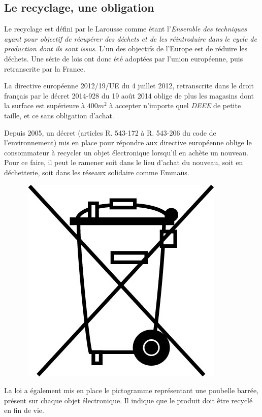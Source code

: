 \subsection{Le recyclage, une obligation}

Le recyclage est défini par le Larousse  comme étant l'\og{}\textit{Ensemble des techniques ayant pour objectif de récupérer des déchets et de les réintroduire dans le cycle de production dont ils sont issus}\fg{}. L'un des objectifs de l'Europe est de réduire les déchets. Une série de lois ont donc été adoptées par l'union européenne, puis retranscrite par la France. 

La directive européenne 2012/19/UE du 4 juillet 2012, retranscrite dans le droit français par le décret 2014-928 du 19 août 2014 oblige de plus les magasins dont la surface est supérieure à $400m^2$ à accepter n'importe quel \textit{DEEE} de petite taille, et ce sans obligation d'achat. 

Depuis 2005, un décret (articles R. 543-172 à R. 543-206 du code de l'environnement) mis en place pour répondre aux directive européenne oblige le consommateur à recycler un objet électronique lorsqu'il en achète un nouveau. Pour ce faire, il peut le ramener soit dans le lieu d'achat du nouveau, soit en déchetterie, soit dans les réseaux solidaire comme Emmaüs.

\begin{figure}
~\includegraphics[scale=0.33]{Rsc/pictopoubellebarree.jpg} 
\end{figure} 
La loi a également mis en place le pictogramme représentant une poubelle barrée, présent sur chaque objet électronique. Il indique que le produit doit être recyclé en fin de vie. 


